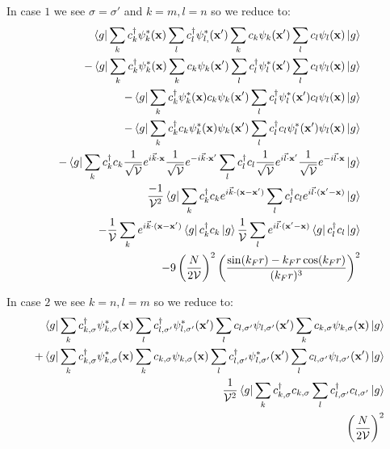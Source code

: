 \documentclass{beamer}
\begin{document}
\begin{frame}
In case $1$ we see $\sigma = \sigma'$ and $k=m, l=n$ so we reduce to:
\begin{align*}
\bra{g}\sum_k c_{k}^\dagger \psi_{k}^\ast(\textbf{x}) \sum_{l} c_{l}^\dagger \psi_{l,}^\ast (\textbf{x}') \sum_k c_{k} \psi_{k}(\textbf{x}') \sum_l c_{l} \psi_{l}(\textbf{x}) \ket{g} \\
-\bra{g}\sum_k c_{k}^\dagger \psi_{k}^\ast(\textbf{x})  \sum_k c_{k} \psi_{k}(\textbf{x}') \sum_{l} c_{l}^\dagger \psi_{l}^\ast (\textbf{x}') \sum_l c_{l} \psi_{l}(\textbf{x}) \ket{g} \\
-\bra{g}\sum_k c_{k}^\dagger \psi_{k}^\ast(\textbf{x}) c_{k} \psi_{k}(\textbf{x}') \sum_{l} c_{l}^\dagger \psi_{l}^\ast (\textbf{x}') c_{l} \psi_{l}(\textbf{x}) \ket{g} \\
-\bra{g}\sum_k c_{k}^\dagger c_{k} \psi_{k}^\ast(\textbf{x}) \psi_{k}(\textbf{x}') \sum_{l} c_{l}^\dagger  c_{l}\psi_{l}^\ast (\textbf{x}') \psi_{l}(\textbf{x}) \ket{g} \\
-\bra{g}\sum_k c_{k}^\dagger c_{k} \frac{1}{\sqrt{\mathcal{V}}} e^{i\vec{k}\cdot\textbf{x}} \frac{1}{\sqrt{\mathcal{V}}}e^{-i\vec{k}\cdot\textbf{x}'} \sum_{l} c_{l}^\dagger  c_{l} \frac{1}{\sqrt{\mathcal{V}}}e^{i\vec{l}\cdot\textbf{x}'} \frac{1}{\sqrt{\mathcal{V}}}e^{-i\vec{l}\cdot\textbf{x}}\ket{g} \\
\frac{-1}{\mathcal{V}^2}\bra{g}\sum_k c_{k}^\dagger c_{k} e^{i\vec{k}\cdot(\textbf{x}-\textbf{x}')} \sum_{l} c_{l}^\dagger  c_{l} e^{i\vec{l}\cdot(\textbf{x}'-\textbf{x})} \ket{g} \\
-\frac{1}{\mathcal{V}}\sum_k e^{i\vec{k}\cdot(\textbf{x}-\textbf{x}')} \bra{g} c_{k}^\dagger c_{k} \ket{g} \frac{1}{\mathcal{V}} \sum_l e^{i\vec{l}\cdot(\textbf{x}'-\textbf{x})} \bra{g} c_{l}^\dagger  c_{l} \ket{g} \\
-9\left(\frac{N}{2\mathcal{V}}\right)^2 \left( \frac{\sin(k_Fr) - k_Fr \cos(k_Fr)}{(k_Fr)^3}\right)^2
\end{align*}

In case $2$ we see $k=n, l=m$ so we reduce to:
\begin{align*}
\bra{g}\sum_k c_{k,\sigma}^\dagger \psi_{k,\sigma}^\ast(\textbf{x}) \sum_{l} c_{l,\sigma'}^\dagger \psi_{l,\sigma'}^\ast (\textbf{x}') \sum_l c_{l,\sigma'} \psi_{l,\sigma'}(\textbf{x}') \sum_k c_{k,\sigma} \psi_{k,\sigma}(\textbf{x}) \ket{g} \\
+\bra{g}\sum_k c_{k,\sigma}^\dagger \psi_{k,\sigma}^\ast(\textbf{x}) \sum_k c_{k,\sigma} \psi_{k,\sigma}(\textbf{x}) \sum_{l} c_{l,\sigma'}^\dagger \psi_{l,\sigma'}^\ast (\textbf{x}') \sum_l c_{l,\sigma'} \psi_{l,\sigma'}(\textbf{x}')  \ket{g} \\
\frac{1}{\mathcal{V}^2} \bra{g} \sum_k c_{k,\sigma}^\dagger c_{k,\sigma} \sum_l c_{l,\sigma'}^\dagger c_{l,\sigma'} \ket{g} \\
\left(\frac{N}{2\mathcal{V}}\right)^2
\end{align*}


\end{frame}
\end{document}
